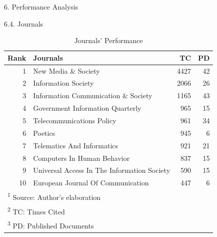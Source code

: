 \documentclass[
  ignorenonframetext,
]{beamer}
\begin{document}
\begin{frame}{6. Performance Analysis}
\protect\hypertarget{performance-analysis-4}{}
\begin{block}{6.4. Journals}
\protect\hypertarget{journals}{}
\begin{table}

\caption{\label{tab:Influencial SO}Journals' Performance}
\centering
\fontsize{8}{10}\selectfont
\begin{tabular}[t]{r|l|r|r}
\hline
\textbf{Rank} & \textbf{Journals} & \textbf{TC} & \textbf{PD}\\
\hline
1 & New Media \& Society & 4427 & 42\\
\hline
2 & Information Society & 2066 & 26\\
\hline
3 & Information Communication \& Society & 1165 & 43\\
\hline
4 & Government Information Quarterly & 965 & 15\\
\hline
5 & Telecommunications Policy & 961 & 34\\
\hline
6 & Poetics & 945 & 6\\
\hline
7 & Telematics And Informatics & 921 & 21\\
\hline
8 & Computers In Human Behavior & 837 & 15\\
\hline
9 & Universal Access In The Information Society & 590 & 15\\
\hline
10 & European Journal Of Communication & 447 & 6\\
\hline
\multicolumn{4}{l}{\textsuperscript{1} Source: Author's elaboration}\\
\multicolumn{4}{l}{\textsuperscript{2} TC: Times Cited}\\
\multicolumn{4}{l}{\textsuperscript{3} PD: Published Documents}\\
\end{tabular}
\end{table}
\end{block}
\end{frame}
\end{document}
